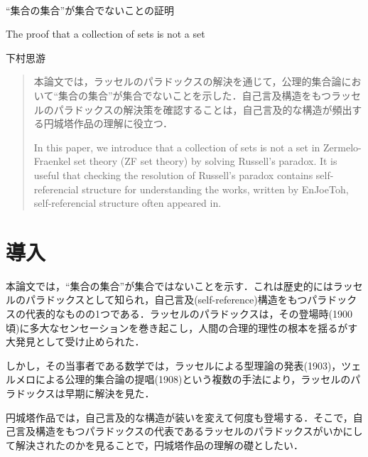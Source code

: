 \documentclass[10pt, a5paper, twoside]{jsarticle}
\theoremstyle{definition}
\begin{document}
	{\Large 　} %

	\begin{center}

		\Large{“集合の集合”が集合でないことの証明}

		\vspace{3mm}

		\large{The proof that a collection of sets is not a set}

		\vspace{3mm}
		
		\large{下村思游}

	\end{center}

	\vspace{3mm}

	\begin{abstract}

		本論文では，ラッセルのパラドックスの解決を通じて，公理的集合論において“集合の集合”が集合でないことを示した．自己言及構造をもつラッセルのパラドックスの解決策を確認することは，自己言及的な構造が頻出する円城塔作品の理解に役立つ．

		\vspace{3mm}

		In this paper, we introduce that a collection of sets is not a set in Zermelo-Fraenkel set theory (ZF set theory) by solving Russell's paradox. It is useful that checking the resolution of Russell's paradox contains self-referencial structure for understanding the works, written by EnJoeToh, self-referencial structure often appeared in.

	\end{abstract}

	\section{導入}

		本論文では，“集合の集合”が集合ではないことを示す．これは歴史的にはラッセルのパラドックスとして知られ，自己言及(self-reference)構造をもつパラドックスの代表的なものの1つである．ラッセルのパラドックスは，その登場時(1900頃)\cite{fre,dis}に多大なセンセーションを巻き起こし，人間の合理的理性の根本を揺るがす大発見として受け止められた\cite{noe}．

		しかし，その当事者である数学では，ラッセルによる型理論の発表(1903)\cite{rus}，ツェルメロによる公理的集合論の提唱(1908)\cite{zer}という複数の手法により，ラッセルのパラドックスは早期に解決を見た．

		円城塔作品では，自己言及的な構造が装いを変えて何度も登場する．そこで，自己言及構造をもつパラドックスの代表であるラッセルのパラドックスがいかにして解決されたのかを見ることで，円城塔作品の理解の礎としたい．
\end{document}

